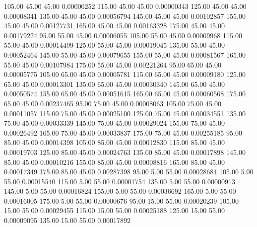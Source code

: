     105.00     45.00     45.00     0.00000252
    115.00     45.00     45.00     0.00000343
    125.00     45.00     45.00     0.00008341
    135.00     45.00     45.00     0.00056794
    145.00     45.00     45.00     0.00102857
    155.00     45.00     45.00     0.00127731
    165.00     45.00     45.00     0.00163328
    175.00     45.00     45.00     0.00179224
     95.00     55.00     45.00     0.00006055
    105.00     55.00     45.00     0.00009968
    115.00     55.00     45.00     0.00014499
    125.00     55.00     45.00     0.00019045
    135.00     55.00     45.00     0.00052464
    145.00     55.00     45.00     0.00079655
    155.00     55.00     45.00     0.00081567
    165.00     55.00     45.00     0.00107984
    175.00     55.00     45.00     0.00221264
     95.00     65.00     45.00     0.00005775
    105.00     65.00     45.00     0.00005781
    115.00     65.00     45.00     0.00009180
    125.00     65.00     45.00     0.00013301
    135.00     65.00     45.00     0.00030340
    145.00     65.00     45.00     0.00050574
    155.00     65.00     45.00     0.00051615
    165.00     65.00     45.00     0.00060568
    175.00     65.00     45.00     0.00237465
     95.00     75.00     45.00     0.00008063
    105.00     75.00     45.00     0.00011057
    115.00     75.00     45.00     0.00025100
    125.00     75.00     45.00     0.00034551
    135.00     75.00     45.00     0.00033339
    145.00     75.00     45.00     0.00029024
    155.00     75.00     45.00     0.00026492
    165.00     75.00     45.00     0.00033837
    175.00     75.00     45.00     0.00255185
     95.00     85.00     45.00     0.00014398
    105.00     85.00     45.00     0.00012830
    115.00     85.00     45.00     0.00019703
    125.00     85.00     45.00     0.00024763
    135.00     85.00     45.00     0.00017898
    145.00     85.00     45.00     0.00010216
    155.00     85.00     45.00     0.00008816
    165.00     85.00     45.00     0.00017349
    175.00     85.00     45.00     0.00287398
     95.00      5.00     55.00     0.00028684
    105.00      5.00     55.00     0.00015540
    115.00      5.00     55.00     0.00001754
    135.00      5.00     55.00     0.00000913
    145.00      5.00     55.00     0.00016824
    155.00      5.00     55.00     0.00036692
    165.00      5.00     55.00     0.00016005
    175.00      5.00     55.00     0.00000676
     95.00     15.00     55.00     0.00020239
    105.00     15.00     55.00     0.00029455
    115.00     15.00     55.00     0.00025188
    125.00     15.00     55.00     0.00009095
    135.00     15.00     55.00     0.00017892
